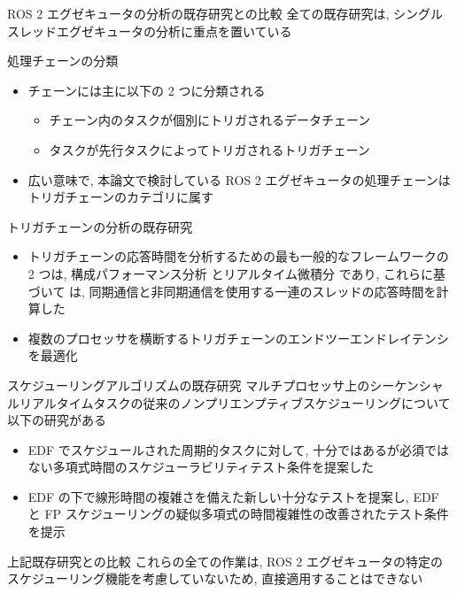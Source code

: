 {    \begin{frame}{ROS 2 エグゼキュータの分析の既存研究との比較}
        全ての既存研究は, シングルスレッドエグゼキュータの分析に重点を置いている
    \end{frame}


    \begin{frame}{処理チェーンの分類}
        \begin{itemize}
            \item チェーンには主に以下の 2 つに分類される
                  \begin{itemize}
                      \item チェーン内のタスクが個別にトリガされるデータチェーン
                      \item タスクが先行タスクによってトリガされるトリガチェーン
                  \end{itemize}
            \item 広い意味で, 本論文で検討している ROS 2 エグゼキュータの処理チェーンはトリガチェーンのカテゴリに属す
        \end{itemize}
    \end{frame}

    \begin{frame}{トリガチェーンの分析の既存研究}
        \begin{itemize}
            \item トリガチェーンの応答時間を分析するための最も一般的なフレームワークの 2 つは, 構成パフォーマンス分析 \cite{henia2005system} とリアルタイム微積分 \cite{chakraborty2003general} であり, これらに基づいて \cite{schlatow2016response} は, 同期通信と非同期通信を使用する一連のスレッドの応答時間を計算した
            \item 複数のプロセッサを横断するトリガチェーンのエンドツーエンドレイテンシを最適化 \cite{schliecker2009recursive}
        \end{itemize}
    \end{frame}

    \begin{frame}{スケジューリングアルゴリズムの既存研究}
        マルチプロセッサ上のシーケンシャルリアルタイムタスクの従来のノンプリエンプティブスケジューリングについて以下の研究がある
        \begin{itemize}
            \item EDF でスケジュールされた周期的タスクに対して, 十分ではあるが必須ではない多項式時間のスケジューラビリティテスト条件を提案した \cite{baruah2006non}
            \item EDF の下で線形時間の複雑さを備えた新しい十分なテストを提案し, EDF と FP スケジューリングの疑似多項式の時間複雑性の改善されたテスト条件を提示 \cite{guan2008new}
        \end{itemize}
    \end{frame}

    \begin{frame}{上記既存研究との比較}
        これらの全ての作業は, ROS 2 エグゼキュータの特定のスケジューリング機能を考慮していないため, 直接適用することはできない
    \end{frame}
}
